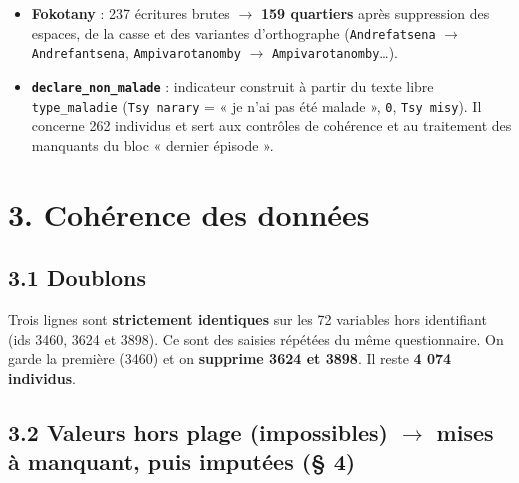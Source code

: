 \documentclass[

  french,

  10pt,

  a4paper,

]{article}
\providecommand{\tightlist}{%

  \setlength{\itemsep}{0pt}\setlength{\parskip}{0pt}}
\begin{document}
\begin{itemize}

\tightlist

\item

  \textbf{Fokotany} : 237 écritures brutes \ensuremath{\rightarrow} \textbf{159 quartiers} après suppression des espaces, de la casse et des variantes d'orthographe (\texttt{Andrefatsena} \ensuremath{\rightarrow} \texttt{Andrefantsena}, \texttt{Ampivarotanomby} \ensuremath{\rightarrow} \texttt{Ampivarotan\textquotesingle{}omby}\ldots).

\item

  \textbf{\texttt{declare\_non\_malade}} : indicateur construit à partir du texte libre \texttt{type\_maladie} (\texttt{Tsy\ narary} = « je n'ai pas été malade », \texttt{0}, \texttt{Tsy\ misy}). Il concerne 262 individus et sert aux contrôles de cohérence et au traitement des manquants du bloc « dernier épisode ».

\end{itemize}



\section{3. Cohérence des données}



\subsection{3.1 Doublons}



Trois lignes sont \textbf{strictement identiques} sur les 72 variables hors identifiant (ids 3460, 3624 et 3898). Ce sont des saisies répétées du même questionnaire. On garde la première (3460) et on \textbf{supprime 3624 et 3898}. Il reste \textbf{4 074 individus}.



\subsection{3.2 Valeurs hors plage (impossibles) \texorpdfstring{\ensuremath{\rightarrow}}{->} mises à manquant, puis imputées (\texorpdfstring{\S{}}{par.} 4)}
\end{document}
